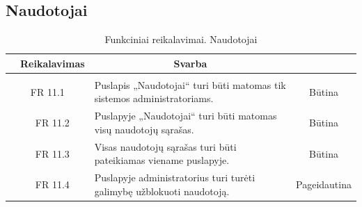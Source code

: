 \documentclass{VUMIFPSkursinis}
\begin{document}
	\subsection{Naudotojai}
	\begin{table}[H]
		\caption{Funkciniai reikalavimai. Naudotojai}
		\begin{tabular}{|p{1cm}|p{1cm}|p{}|p{}|}
			\hline 
			\rowcolor{gray!50}
			\multicolumn{2}{|c|}{{\bfseries Kodas}}&
			\multicolumn{1}{c|}{{\bfseries Reikalavimas}}&
			\multicolumn{1}{c|}{{\bfseries Svarba}}\\
			\hline
			\rowcolor{lightgray}
			\multicolumn{4}{|c|}{Naudotojai}\\				
			\hline
			\multicolumn{2}{|c|}{FR 11.1}&
			{Puslapis „Naudotojai“ turi būti matomas tik sistemos administratoriams.
			}&		
			\multicolumn{1}{c|}{Būtina}\\
			\hline
			\multicolumn{1}{|c}{}&
			\multicolumn{1}{c|}{FR 11.2}&
			{Puslapyje „Naudotojai“ turi būti matomas visų naudotojų sąrašas.
			}&		
			\multicolumn{1}{c|}{Būtina}\\
			\hline	
			\multicolumn{1}{|c}{}&
			\multicolumn{1}{c|}{FR 11.3}&
			{Visas naudotojų sąrašas turi būti pateikiamas viename puslapyje.
			}&
			\multicolumn{1}{c|}{Būtina}\\									
			\hline
			\multicolumn{1}{|c}{}&
			\multicolumn{1}{c|}{FR 11.4}&
			{Puslapyje administratorius turi turėti galimybę užblokuoti naudotoją.
			}&
			\multicolumn{1}{c|}{Pageidautina}\\									
			\hline
		\end{tabular}		
	\end{table}
	
\end{document}
